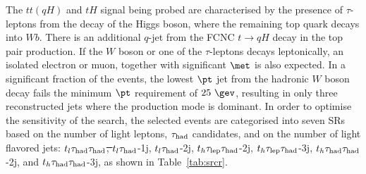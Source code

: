 \documentclass[PAPER, coverpage, atlasdraft=true, texlive=2016, UKenglish]{\ATLASLATEXPATH atlasdoc}
\providecommand{\DIFadd}[1]{{\protect\color{blue}\uwave{#1}}} %
\providecommand{\DIFdel}[1]{{\protect\color{red}\sout{#1}}}                      %
\providecommand{\DIFaddbegin}{} %
\providecommand{\DIFaddend}{} %
\providecommand{\DIFdelbegin}{} %
\providecommand{\DIFdelend}{} %
\begin{document}
\DIFdelend %
The $tt(qH)$ and $tH$ signal being probed are characterised by the presence of $\tau$-leptons from the decay of 
the Higgs boson, where the remaining top quark decays into $Wb$. There is an additional $q$-jet from the FCNC $t\to qH$ decay in the top pair production. 
If the $W$ boson or one of the $\tau$-leptons decays leptonically, an isolated electron or muon, together with significant $\met$ is also expected.
In a significant fraction of the events, the lowest $\pt$ jet from the hadronic $W$ boson decay fails the minimum $\pt$ requirement of $25~\gev$,
resulting in only three reconstructed jets where the production mode is dominant. 
In order to optimise the sensitivity of the search, the selected events are categorised into seven SRs based on the number of light leptons,
$\tau_{\mathrm{had}}$ candidates, and on the number of light flavored jets:
\DIFdelbegin \DIFdel{$t_l\tau_{\mathrm{had}} \tau_{\mathrm{had}}$, $t_l\tau_{\mathrm{had}}$}\DIFdelend \DIFaddbegin \DIFadd{$t_{\ell}\hadhad$, $t_{\ell}\had$}\DIFaddend -1j, \DIFdelbegin \DIFdel{$t_l\tau_{\mathrm{had}}$}\DIFdelend \DIFaddbegin \DIFadd{$t_{\ell}\had$}\DIFaddend -2j, $t_h\tau_{\mathrm{lep}} \tau_{\mathrm{had}}$-2j, $t_h\tau_{\mathrm{lep}} \tau_{\mathrm{had}}$-3j, $t_h\tau_{\mathrm{had}} \tau_{\mathrm{had}}$-2j, and $t_h\tau_{\mathrm{had}} \tau_{\mathrm{had}}$-3j, as shown in Table~\ref{tab:srcr}. 
\end{document}
